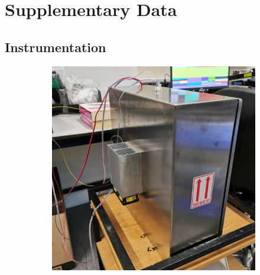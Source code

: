 \ifpdf
    \graphicspath{{Appendix1/Figs/Raster/}{Appendix1/Figs/PDF/}{Appendix1/Figs/}}
\else
    \graphicspath{{Appendix1/Figs/Vector/}{Appendix1/Figs/}}
\fi

\chapter{Supplementary Data} 
\section*{Instrumentation}
\begin{figure}[h!]
    \begin{subfigure}{0.49\textwidth}
        \includegraphics[width=\textwidth]{enclosure_back}
    \end{subfigure}
    \hspace*{\fill}
    \begin{subfigure}{0.49\textwidth}

\end{subfigure}
\end{figure}
